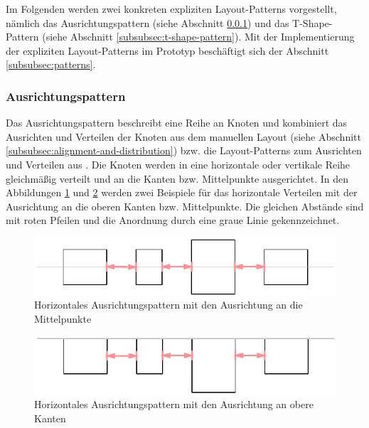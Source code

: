 Im Folgenden werden zwei konkreten expliziten Layout-Patterns vorgestellt, nämlich das Ausrichtungspattern (siehe Abschnitt \ref{subsubsec:alignment-pattern}) und das T-Shape-Pattern (siehe Abschnitt \ref{subsubsec:t-shape-pattern}). Mit der Implementierung der expliziten Layout-Patterns im Prototyp beschäftigt sich der Abschnitt \ref{subsubsec:patterns}.

\subsubsection{Ausrichtungspattern}
\label{subsubsec:alignment-pattern}

Das Ausrichtungspattern beschreibt eine Reihe an Knoten und kombiniert das Ausrichten und Verteilen der Knoten aus dem manuellen Layout (siehe Abschnitt \ref{subsubsec:alignment-and-distribution}) bzw. die Layout-Patterns zum Ausrichten und Verteilen aus \cite[S.143ff und S.136ff]{Maier12A-Pattern-based}. Die Knoten werden in eine horizontale oder vertikale Reihe gleichmäßig verteilt und an die Kanten bzw. Mittelpunkte ausgerichtet. In den Abbildungen \ref{fig:layout-pattern-alignment-center} und \ref{fig:layout-pattern-alignment-top} werden zwei Beispiele für das horizontale Verteilen mit der Ausrichtung an die oberen Kanten bzw. Mittelpunkte. Die gleichen Abstände sind mit roten Pfeilen und die Anordnung durch eine graue Linie gekennzeichnet.

\begin{figure}[hbt]
    \centering
    \includegraphics{resources/layout-pattern-alignment-center}
    \caption{Horizontales Ausrichtungspattern mit den Ausrichtung an die Mittelpunkte}
    \label{fig:layout-pattern-alignment-center}
\end{figure}

\begin{figure}[hbt]
    \centering
    \includegraphics{resources/layout-pattern-alignment-top}
    \caption{Horizontales Ausrichtungspattern mit den Ausrichtung an obere Kanten}
    \label{fig:layout-pattern-alignment-top}
\end{figure}

